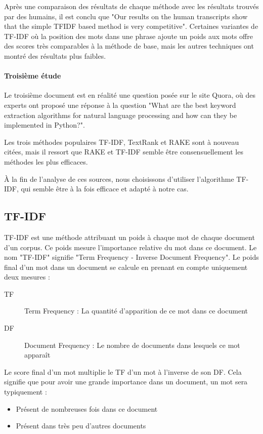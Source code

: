 				Après une comparaison des résultats de chaque méthode avec les résultats trouvés par des humains, il est conclu que "Our results on the human transcripts show that the simple TFIDF based method is very competitive"\cite{text-analysis-src5}. Certaines variantes de TF-IDF où la position des mots dans une phrase ajoute un poids aux mots offre des scores très comparables à la méthode de base, mais les autres techniques ont montré des résultats plus faibles.

			\paragraph{Troisième étude}

				Le troisième document\cite{text-analysis-src6} est en réalité une question posée sur le site Quora, où des experts ont proposé une réponse à la question "What are the best keyword extraction algorithms for natural language processing and how can they be implemented in Python?".

				Les trois méthodes populaires \gls{TF-IDF}, TextRank et \gls{RAKE} sont à nouveau citées, mais il ressort que RAKE et TF-IDF semble être consensuellement les méthodes les plus efficaces.

			À la fin de l'analyse de ces sources, nous choisissons d'utiliser l'algorithme TF-IDF, qui semble être à la fois efficace et adapté à notre cas.

		\subsection{TF-IDF}\label{analyse-tfidf}

			TF-IDF est une méthode attribuant un poids à chaque mot de chaque document d'un corpus. Ce poids mesure l'importance relative du mot dans ce document. Le nom "TF-IDF" signifie "Term Frequency - Inverse Document Frequency". Le poids final d'un mot dans un document se calcule en prenant en compte uniquement deux mesures :
			\begin{description}
				\item[TF] Term Frequency : La quantité d'apparition de ce mot dans ce document
				\item[DF] Document Frequency : Le nombre de documents dans lesquels ce mot apparaît
			\end{description}

			Le score final d'un mot multiplie le TF d'un mot à l'inverse de son DF. Cela signifie que pour avoir une grande importance dans un document, un mot sera typiquement :
			\begin{itemize}
				\item Présent de nombreuses fois dans ce document
				\item Présent dans très peu d'autres documents
			\end{itemize}

